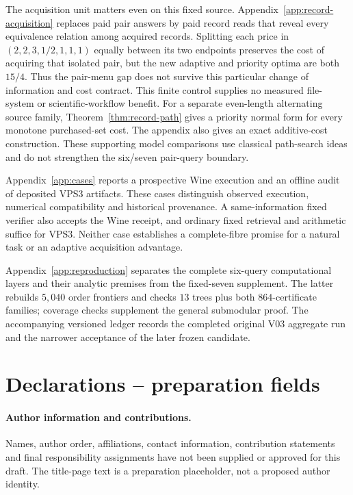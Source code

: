 \documentclass[pdflatex,sn-mathphys-num]{sn-jnl}
\theoremstyle{thmstyleone}
\theoremstyle{thmstylethree}
\theoremstyle{thmstyletwo}
\begin{document}
The acquisition unit matters even on this fixed source. Appendix~\ref{app:record-acquisition} replaces paid pair answers by paid record reads that reveal every equivalence relation among acquired records. Splitting each price in $(2,2,3,1/2,1,1,1)$ equally between its two endpoints preserves the cost of acquiring that isolated pair, but the new adaptive and priority optima are both $15/4$. Thus the pair-menu gap does not survive this particular change of information and cost contract. This finite control supplies no measured file-system or scientific-workflow benefit. For a separate even-length alternating source family, Theorem~\ref{thm:record-path} gives a priority normal form for every monotone purchased-set cost. The appendix also gives an exact additive-cost construction. These supporting model comparisons use classical path-search ideas and do not strengthen the six/seven pair-query boundary.

Appendix~\ref{app:cases} reports a prospective Wine execution and an offline audit of deposited VPS3 artifacts. These cases distinguish observed execution, numerical compatibility and historical provenance. A same-information fixed verifier also accepts the Wine receipt, and ordinary fixed retrieval and arithmetic suffice for VPS3. Neither case establishes a complete-fibre promise for a natural task or an adaptive acquisition advantage.

Appendix~\ref{app:reproduction} separates the complete six-query computational layers and their analytic premises from the fixed-seven supplement. The latter rebuilds $5,040$ order frontiers and checks $13$ trees plus both $864$-certificate families; coverage checks supplement the general submodular proof. The accompanying versioned ledger records the completed original V03 aggregate run and the narrower acceptance of the later frozen candidate.
\label{page:main-end}

\backmatter
\section*{Declarations -- preparation fields}
\paragraph*{Author information and contributions.}
Names, author order, affiliations, contact information, contribution statements and final responsibility assignments have not been supplied or approved for this draft. The title-page text is a preparation placeholder, not a proposed author identity.
\end{document}
